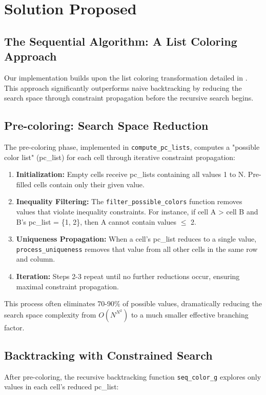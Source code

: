 \section{Solution Proposed}
\label{sec:solution}
\subsection{The Sequential Algorithm: A List Coloring Approach}
\label{sec:sequential_algo}
Our implementation builds upon the list coloring transformation detailed in \cite{Sen2024Futoshiki}. This approach significantly outperforms naive backtracking by reducing the search space through constraint propagation before the recursive search begins.

\subsection{Pre-coloring: Search Space Reduction}
The pre-coloring phase, implemented in \texttt{compute\_pc\_lists}, computes a "possible color list" (pc\_list) for each cell through iterative constraint propagation:

\begin{enumerate}
    \item \textbf{Initialization:} Empty cells receive pc\_lists containing all values 1 to N. Pre-filled cells contain only their given value.
    
    \item \textbf{Inequality Filtering:} The \texttt{filter\_possible\_colors} function removes values that violate inequality constraints. For instance, if cell A > cell B and B's pc\_list = \{1, 2\}, then A cannot contain values $\leq$ 2.
    
    \item \textbf{Uniqueness Propagation:} When a cell's pc\_list reduces to a single value, \texttt{process\_uniqueness} removes that value from all other cells in the same row and column.
    
    \item \textbf{Iteration:} Steps 2-3 repeat until no further reductions occur, ensuring maximal constraint propagation.
\end{enumerate}

This process often eliminates 70-90\% of possible values, dramatically reducing the search space complexity from $O(N^{N^2})$ to a much smaller effective branching factor.

\subsection{Backtracking with Constrained Search}
After pre-coloring, the recursive backtracking function \texttt{seq\_color\_g} explores only values in each cell's reduced pc\_list:


